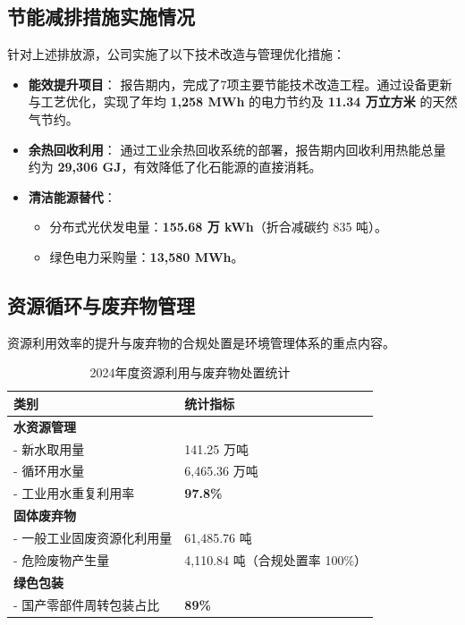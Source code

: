 \documentclass[a4paper,12pt]{article}
\begin{document}
\subsection{节能减排措施实施情况}
针对上述排放源，公司实施了以下技术改造与管理优化措施：

\begin{itemize}
    \item \textbf{能效提升项目}：
    报告期内，完成了7项主要节能技术改造工程。通过设备更新与工艺优化，实现了年均 \textbf{1,258 MWh} 的电力节约及 \textbf{11.34 万立方米} 的天然气节约。
    \item \textbf{余热回收利用}：
    通过工业余热回收系统的部署，报告期内回收利用热能总量约为 \textbf{29,306 GJ}，有效降低了化石能源的直接消耗。
    \item \textbf{清洁能源替代}：
    \begin{itemize}
        \item 分布式光伏发电量：\textbf{155.68 万 kWh}（折合减碳约 835 吨）。
        \item 绿色电力采购量：\textbf{13,580 MWh}。
    \end{itemize}
\end{itemize}

\subsection{资源循环与废弃物管理}
资源利用效率的提升与废弃物的合规处置是环境管理体系的重点内容。

\begin{table}[h]
\centering
\caption{2024年度资源利用与废弃物处置统计}
\begin{tabular}{l l}
\toprule
\textbf{类别} & \textbf{统计指标} \\
\midrule
\textbf{水资源管理} & \\
- 新水取用量 & 141.25 万吨 \\
- 循环用水量 & 6,465.36 万吨 \\
- 工业用水重复利用率 & \textbf{97.8\%} \\
\midrule
\textbf{固体废弃物} & \\
- 一般工业固废资源化利用量 & 61,485.76 吨 \\
- 危险废物产生量 & 4,110.84 吨（合规处置率 100\%） \\
\midrule
\textbf{绿色包装} & \\
- 国产零部件周转包装占比 & \textbf{89\%} \\
\bottomrule
\end{tabular}
\end{table}
\end{document}
